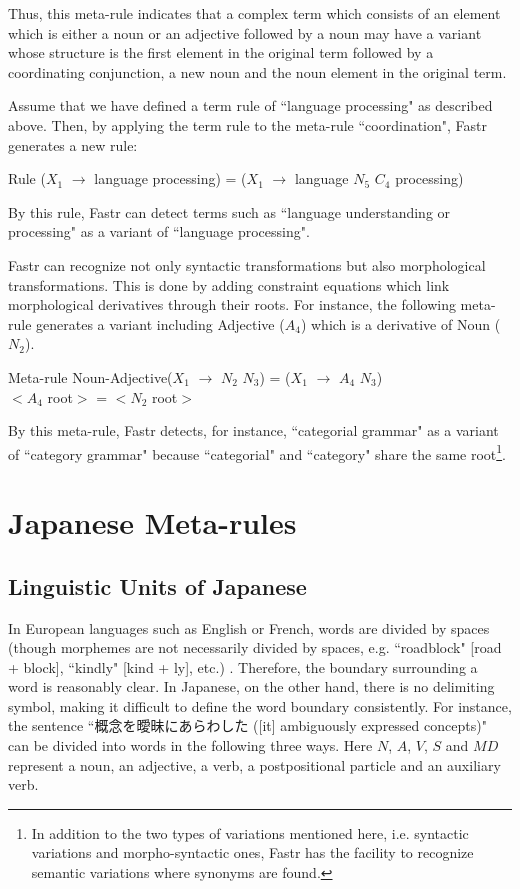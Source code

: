 Thus, this meta-rule indicates that a complex term which consists of an element which is either a noun or an adjective followed by a noun may have a variant whose structure is the first element in the original term followed by a coordinating conjunction, a new noun and the noun element in the original term.

Assume that we have defined a term rule of ``language processing" as described above. Then, by applying the term rule to the meta-rule ``coordination", Fastr generates a new rule:

\vspace*{5mm}
\noindent
Rule ($X_1$ $\rightarrow$ language processing) = ($X_1$ $\rightarrow$ language $N_5$ $C_4$ processing)
\vspace*{5mm}

\noindent
By this rule, Fastr can detect terms such as ``language understanding or processing" as a variant of ``language processing".

Fastr can recognize not only syntactic transformations but also morphological transformations. This is done by adding constraint equations which link morphological derivatives through their roots. For instance, the following meta-rule generates a variant including Adjective ($A_4$) which is a derivative of Noun ($N_2$).

\vspace*{5mm}
\noindent
Meta-rule Noun-Adjective($X_1$ $\rightarrow$ $N_2$ $N_3$) = ($X_1$ $\rightarrow$ $A_4$ $N_3$)\\
$<A_4$ root$>$ = $<N_2$ root$>$
\vspace*{5mm}

\noindent
By this meta-rule, Fastr detects, for instance, ``categorial grammar" as a variant of ``category grammar" because ``categorial" and ``category" share the same root\footnote{In addition to the two types of variations mentioned here, i.e. syntactic variations and morpho-syntactic ones, Fastr has the facility to recognize semantic variations where synonyms are found.}.

\section{Japanese Meta-rules}

\subsection{Linguistic Units of Japanese}

In European languages such as English or French, words are divided by spaces (though morphemes are not necessarily divided by spaces, e.g. ``roadblock" [road + block], ``kindly" [kind + ly], etc.) \cite{Lieber}. Therefore, the boundary surrounding a word is reasonably clear. In Japanese, on the other hand, there is no delimiting symbol, making it difficult to define the word boundary consistently.
For instance, the sentence ``概念を曖昧にあらわした ([it] ambiguously expressed concepts)" can be divided into words in the following three ways. Here $N$, $A$, $V$, $S$ and $MD$ represent a noun, an adjective, a verb, a postpositional particle and an auxiliary verb.

